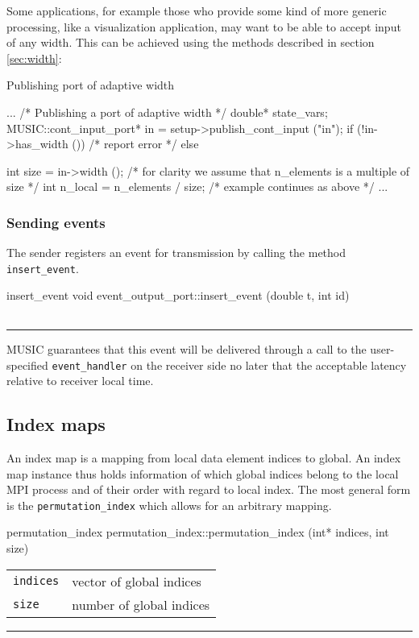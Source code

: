 \documentclass[a4paper]{report}
\makeatletter
\newenvironment{parameters}%
{\begin{tabular}{@{\hspace{2em}}lp{0.6\textwidth}}}%
{\end{tabular}\par\vspace{1mm}\par\hrule\par\vspace{5mm}}
\makeatother
\begin{document}
Some applications, for example those who provide some kind of more
generic processing, like a visualization application, may want to be
able to accept input of any width.  This can be achieved using the
methods described in section \ref{sec:width}:

\pagebreak
\begin{code}{Publishing port of adaptive width\label{code:adaptivewidth}}
{
  ...
  /* Publishing a port of adaptive width */
  double* state_vars;
  MUSIC::cont_input_port* in =
     setup->publish_cont_input ("in");
  if (!in->has_width ())
    /* report error */
  else
    {
      int size = in->width ();
      /* for clarity we assume that n_elements
         is a multiple of size */
      int n_local = n_elements / size;
      /* example continues as above */
      ...
      
    }
}
\end{code}

\subsubsection{Sending events}

The sender registers an event for transmission by calling the method
\lstinline|insert_event|.

\begin{head}{insert_event}
  void event_output_port::insert_event (double t, int id)
\end{head}
\begin{parameters}
\end{parameters}

MUSIC guarantees that this event will be delivered through a call to
the user-specified \lstinline|event_handler| on the receiver side no
later that the acceptable latency relative to receiver local time.

\subsection{Index maps}

An index map is a mapping from local data element indices to
global. An index map instance thus holds information of which global
indices belong to the local MPI process and of their order with regard
to local index.  The most general form is the
\lstinline|permutation_index| which allows for an arbitrary mapping.

\begin{head}{permutation_index}
  permutation_index::permutation_index (int* indices,
                                        int size)
\end{head}
\begin{parameters}
  \lstinline|indices| & vector of global indices \\
  \lstinline|size| & number of global indices \\
\end{parameters}
\end{document}
